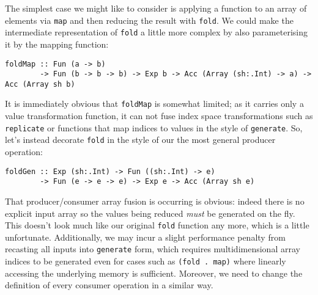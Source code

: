 The simplest case we might like to consider is applying a function to an array
of elements via \texttt{map} and then reducing the result with \texttt{fold}. We
could make the intermediate representation of \texttt{fold} a little more
complex by also parameterising it by the mapping function:
%
\begin{lstlisting}[style=haskell,numbers=none]
foldMap :: Fun (a -> b)
        -> Fun (b -> b -> b) -> Exp b -> Acc (Array (sh:.Int) -> a) -> Acc (Array sh b)
\end{lstlisting}

It is immediately obvious that \texttt{foldMap} is somewhat limited; as it
carries only a value transformation function, it can not fuse index space
transformations such as \texttt{replicate} or functions that map indices to
values in the style of \texttt{generate}. So, let's instead decorate
\texttt{fold} in the style of our the most general producer operation:
%
\begin{lstlisting}[style=haskell,numbers=none]
foldGen :: Exp (sh:.Int) -> Fun ((sh:.Int) -> e)
        -> Fun (e -> e -> e) -> Exp e -> Acc (Array sh e)
\end{lstlisting}
%
That producer/consumer array fusion is occurring is obvious: indeed there is no
explicit input array so the values being reduced \emph{must} be generated on the
fly. This doesn't look much like our original \texttt{fold} function any more,
which is a little unfortunate. Additionally, we may incur a slight performance
penalty from recasting all inputs into \texttt{generate} form, which requires
multidimensional array indices to be generated even for cases such as
\lstinline[style=inline]{(fold . map)} where linearly accessing the underlying
memory is sufficient. Moreover, we need to change the definition of every
consumer operation in a similar way.


